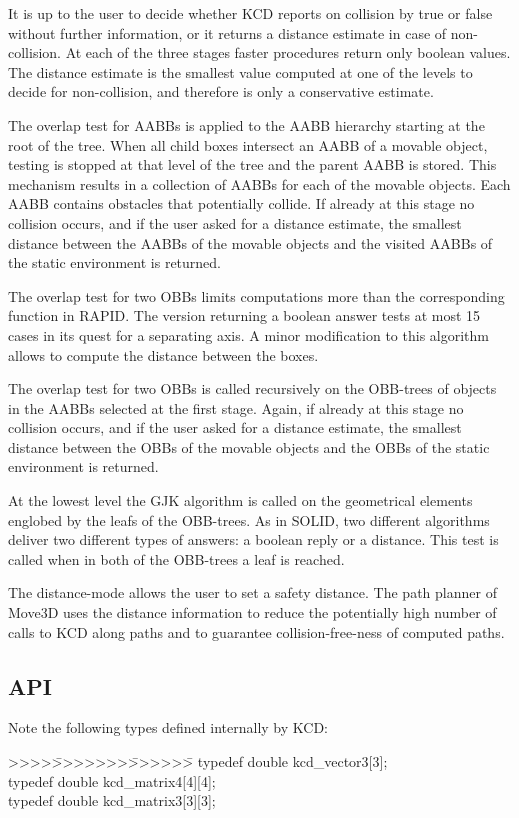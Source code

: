 It is up to the user to decide whether KCD reports on collision 
by true or false without further information, or it returns a 
distance estimate in case of non-collision.
At each of the three stages faster procedures return only boolean
values. The distance estimate is the smallest value computed at
one of the levels to decide for non-collision, and therefore is 
only a conservative estimate. 

The overlap test for AABBs is applied to the AABB hierarchy 
starting at the root of the tree. When all child boxes intersect
an AABB of a movable object, testing is stopped at that level
of the tree and the parent AABB is stored. This mechanism results
in a collection of AABBs for each of the movable objects. Each
AABB contains obstacles that potentially collide. If already 
at this stage no collision occurs, and if the user asked for a
distance estimate, the smallest distance between the AABBs of the
movable objects and the visited AABBs of the static environment
is returned.

The overlap test for two OBBs limits computations more than
the corresponding function in RAPID. The version returning
a boolean answer tests at most 15 cases in its quest for a 
separating axis. A minor modification to this algorithm allows 
to compute the distance between the boxes. 

The overlap test for two OBBs is called recursively on the OBB-trees
of objects in the AABBs selected at the first stage. Again, if already 
at this stage no collision occurs, and if the user asked for a
distance estimate, the smallest distance between the OBBs of the
movable objects and the OBBs of the static environment is returned.

At the lowest level the GJK algorithm is called on the geometrical
elements englobed by the leafs of the OBB-trees. As in SOLID, two 
different algorithms deliver two different types of answers: a
boolean reply or a distance. This test is called when in both of
the OBB-trees a leaf is reached.

The distance-mode allows the user
to set a safety distance. The path planner of Move3D uses the 
distance information to reduce the potentially high number of
calls to KCD along paths and to guarantee collision-free-ness 
of computed paths.

\subsection{API}
Note the following types defined internally by KCD:
\begin{tabbing}
\vspace{-5mm}
>>>>\=>>>>>>>\=>>>>>>\= \kill
\>typedef \>double \>kcd\_vector3[3];\\
\>typedef \>double \>kcd\_matrix4[4][4];\\
\>typedef \>double \>kcd\_matrix3[3][3];
\vspace{-4mm}
\end{tabbing}

